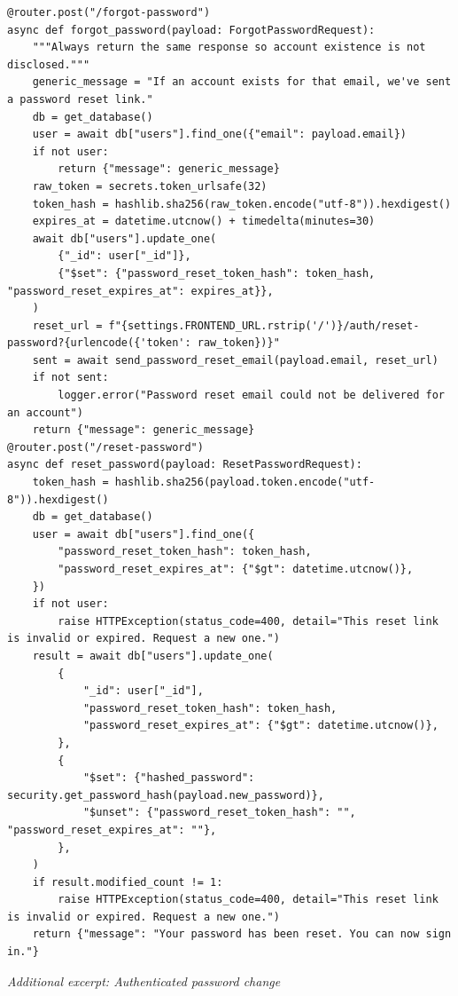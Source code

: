 \documentclass[11pt,a4paper]{article}
\begin{document}
{\begin{lstlisting}[style=python]
@router.post("/forgot-password")
async def forgot_password(payload: ForgotPasswordRequest):
    """Always return the same response so account existence is not disclosed."""
    generic_message = "If an account exists for that email, we've sent a password reset link."
    db = get_database()
    user = await db["users"].find_one({"email": payload.email})
    if not user:
        return {"message": generic_message}
    raw_token = secrets.token_urlsafe(32)
    token_hash = hashlib.sha256(raw_token.encode("utf-8")).hexdigest()
    expires_at = datetime.utcnow() + timedelta(minutes=30)
    await db["users"].update_one(
        {"_id": user["_id"]},
        {"$set": {"password_reset_token_hash": token_hash, "password_reset_expires_at": expires_at}},
    )
    reset_url = f"{settings.FRONTEND_URL.rstrip('/')}/auth/reset-password?{urlencode({'token': raw_token})}"
    sent = await send_password_reset_email(payload.email, reset_url)
    if not sent:
        logger.error("Password reset email could not be delivered for an account")
    return {"message": generic_message}
@router.post("/reset-password")
async def reset_password(payload: ResetPasswordRequest):
    token_hash = hashlib.sha256(payload.token.encode("utf-8")).hexdigest()
    db = get_database()
    user = await db["users"].find_one({
        "password_reset_token_hash": token_hash,
        "password_reset_expires_at": {"$gt": datetime.utcnow()},
    })
    if not user:
        raise HTTPException(status_code=400, detail="This reset link is invalid or expired. Request a new one.")
    result = await db["users"].update_one(
        {
            "_id": user["_id"],
            "password_reset_token_hash": token_hash,
            "password_reset_expires_at": {"$gt": datetime.utcnow()},
        },
        {
            "$set": {"hashed_password": security.get_password_hash(payload.new_password)},
            "$unset": {"password_reset_token_hash": "", "password_reset_expires_at": ""},
        },
    )
    if result.modified_count != 1:
        raise HTTPException(status_code=400, detail="This reset link is invalid or expired. Request a new one.")
    return {"message": "Your password has been reset. You can now sign in."}
\end{lstlisting}

\textit{Additional excerpt: Authenticated password change}

}
\end{document}
